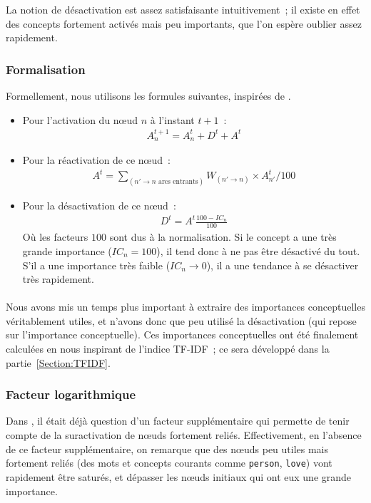 \documentclass[a4paper, 12pt]{article}
\begin{document}
La notion de désactivation est assez satisfaisante intuitivement~; il existe en effet des concepts fortement activés mais peu importants, que l'on espère oublier assez rapidement. 

\subsubsection{Formalisation}
Formellement, nous utilisons les formules suivantes, inspirées de \cite{parmentier_specification_1998}.

\begin{itemize}
  \item Pour l'activation du n\oe{}ud $n$ à l'instant $t+1$~:
\begin{align}
 A_n^{t+1} = A_n^t + D^t + A^t
\end{align}
\item Pour la réactivation de ce n\oe{}ud~:
\begin{align}
 A^t = \sum_{(n' \rightarrow n \text{\ arcs entrants})} W_{(n'\rightarrow  n)} \times A_{n'}^t / 100
\end{align}
\item Pour la désactivation de ce n\oe{}ud~:
\begin{align}
 D^t = A^t \frac{100- IC_n}{100}
\end{align}
Où les facteurs $100$ sont dus à la normalisation. Si le concept a une très grande importance ($IC_n = 100$), il tend donc à ne pas être désactivé du tout. S'il a une importance très faible ($IC_n \rightarrow 0$), il a une tendance à se désactiver très rapidement.
\end{itemize}

\paragraph{}
Nous avons mis un temps plus important à extraire des importances conceptuelles véritablement utiles, et n'avons donc que peu utilisé la désactivation (qui repose sur l'importance conceptuelle). Ces importances conceptuelles ont été finalement calculées en nous inspirant de l'indice TF-IDF~; ce sera développé dans la partie~\ref{Section:TFIDF}.

\subsubsection{Facteur logarithmique}
Dans \cite{parmentier_specification_1998}, il était déjà question d'un facteur supplémentaire qui permette de tenir compte de la suractivation de n\oe{}uds fortement reliés. Effectivement, en l'absence de ce facteur supplémentaire, on remarque que des n\oe{}uds peu utiles mais fortement reliés (des mots et concepts courants comme \verb|person|, \verb|love|) vont rapidement être saturés, et dépasser les n\oe{}uds initiaux qui ont eux une grande importance.
\end{document}
